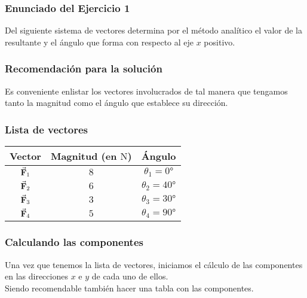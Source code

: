 \documentclass[12pt]{beamer}
\begin{document}
\begin{frame}
\frametitle{Enunciado del Ejercicio 1}
Del siguiente sistema de vectores determina por el método analítico el valor de la resultante y el ángulo que forma con respecto al eje $x$ positivo.
\end{frame}
\begin{frame}[plain]
\begin{figure}
\centering
{}
\end{figure}
\end{frame}
\begin{frame}
\frametitle{Recomendación para la solución}
Es conveniente enlistar los vectores involucrados de tal manera que tengamos tanto la magnitud como el ángulo que establece su dirección.
\end{frame}
\begin{frame}
\frametitle{Lista de vectores}
\begin{table}
\centering
\begin{tabular}{c | c | c }
Vector & Magnitud (en $\unit{\newton}$) & Ángulo \\ \hline
$\va{F}_{1}$ & $8$ & $\theta_{1} = \ang{0}$ \\ \hline
$\va{F}_{2}$ & $6$ & $\theta_{2} = \ang{40}$ \\ \hline
$\va{F}_{3}$ & $3$ & $\theta_{3} = \ang{30}$ \\ \hline
$\va{F}_{4}$ & $5$ & $\theta_{4} = \ang{90}$ \\ \hline
\end{tabular}
\end{table}
\end{frame}
\begin{frame}
\frametitle{Calculando las componentes}
Una vez que tenemos la lista de vectores, iniciamos el cálculo de las componentes en las direcciones $x$ e $y$ de cada uno de ellos.
\\
\bigskip
\pause
Siendo recomendable también hacer una tabla con las componentes.
\end{frame}
\end{document}
